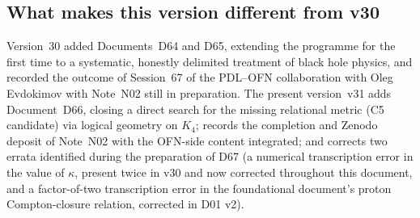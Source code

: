 \documentclass[11pt,a4paper]{article}
\theoremstyle{plain}
\theoremstyle{definition}
\theoremstyle{remark}
\begin{document}
\subsection{What makes this version different from v30}
\label{subsec:diffv30}
Version~30 added Documents~D64 and D65, extending the programme for the first time to a systematic, honestly delimited treatment of black hole physics, and recorded the outcome of Session~67 of the PDL--OFN collaboration with Oleg Evdokimov with Note~N02 still in preparation. The present version~v31 adds Document~D66, closing a direct search for the missing relational metric (C5 candidate) via logical geometry on $K_4$; records the completion and Zenodo deposit of Note~N02 with the OFN-side content integrated; and corrects two errata identified during the preparation of D67 (a numerical transcription error in the value of $\kappa$, present twice in v30 and now corrected throughout this document, and a factor-of-two transcription error in the foundational document's proton Compton-closure relation, corrected in D01 v2).
\end{document}

